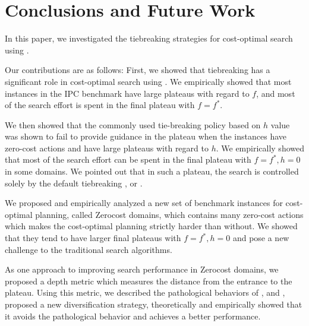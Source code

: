 
\section{Conclusions and Future Work}

In this paper, we investigated the tiebreaking strategies for cost-optimal search using \astar.  
\begin{comment} %
We sought to (1) shed some light on the importance of tiebreaking in \astar,  %
(2) improve \astar without modifying its main heuristic function at all, and (3) to
improve \astar by introducing inadmissible techniques. We reached all of these goals successfully: We sought
various possible enhancements and achieved significant performance improvements solely by the tiebreaking
techniques. In detail, the contributions in this paper are the following:
\end{comment}
Our contributions are as follows:
 First, we showed that tiebreaking has a significant role in cost-optimal
       search using \astar. We empirically showed that most instances in the IPC
       benchmark have large plateaus with regard to $f$, and most of the
       search effort is spent in the final plateau with $f=f^*$.

 We then showed that  the commonly used tie-breaking policy based on $h$ value was shown to fail to
       provide guidance in the plateau when the instances have zero-cost
       actions and have large plateaus with regard to $h$.
       We empirically showed that most of the search effort can be spent in
       the final plateau with $f=f^*, h=0$ in some domains. We pointed out that in such
       a plateau, the search is controlled solely by the
       default tiebreaking \fifo, \lifo or \ro.

 We proposed and empirically analyzed a new set of benchmark instances for cost-optimal planning, called Zerocost
 domains, which contains many zero-cost actions which makes the cost-optimal planning strictly harder than without.
       We showed that they tend to have larger final plateaus with $f=f^*, h=0$ and pose a new challenge to the traditional search algorithms.

 As one approach to improving search performance in Zerocost domains, we proposed a depth metric
       which measures the distance from the entrance to the
       plateau. Using this metric, we described the pathological
       behaviors of \fifo, \lifo and \ro, proposed a new diversification
       strategy, theoretically and empirically showed that it avoids the
       pathological behavior and achieves a better performance.

